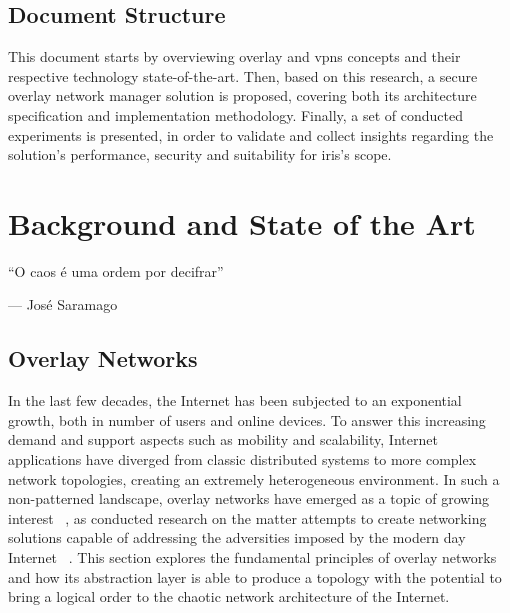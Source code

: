 \documentclass[11pt,twoside,a4paper]{report}
\begin{document}
\section{Document Structure}

This document starts by overviewing overlay and \acp{vpn} concepts and their respective technology state-of-the-art. Then, based on this research, a secure overlay network manager solution is proposed, covering both its architecture specification and implementation methodology. Finally, a set of conducted experiments is presented, in order to validate and collect insights regarding the solution's performance, security and suitability for \ac{iris}'s scope. 

\cleardoublepage

\chapter{Background and State of the Art}
\label{chapter:sota}

\begin{minipage}{80mm}
     \centering %
     ``O caos é uma ordem por decifrar''
          \begin{flushright}
          --- José Saramago
          \end{flushright}
     \end{minipage}


\section{Overlay Networks}
\label{sec:on}

In the last few decades, the Internet has been subjected to an exponential growth, both in number of users and online devices. To answer this increasing demand and support aspects such as mobility and scalability, Internet applications have diverged from classic distributed systems to more complex network topologies, creating an extremely heterogeneous environment. In such a non-patterned landscape, overlay networks have emerged as a topic of growing interest ~\cite{1610546}, as conducted research on the matter attempts to create networking solutions capable of addressing the adversities imposed by the modern day Internet ~\cite{jannotti2000overcast, waldvogel2003efficient}. This section explores the fundamental principles of overlay networks and how its abstraction layer is able to produce a topology with the potential to bring a logical order to  the chaotic network architecture of the Internet.
\end{document}
